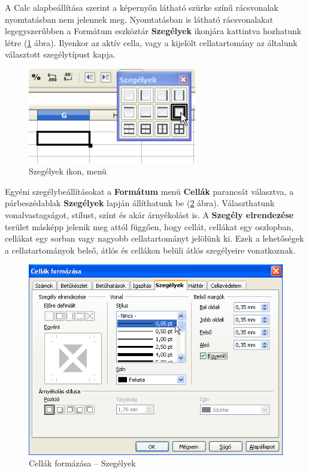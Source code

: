 A Calc alapbeállítása szerint a képernyőn látható
szürke színű rácsvonalak nyomtatásban nem jelennek meg.
Nyomtatásban is látható rácsvonalakat legegyszerűbben a
Formátum eszköztár \textbf{Szegélyek} ikonjára kattintva
hozhatunk létre (\ref{SzegélyekIkon} ábra).  Ilyenkor az aktív
cella, vagy a kijelölt cellatartomány az általunk választott
szegélytípust kapja.

\begin{figure}[!h]
\begin{center}
\includegraphics[width=7.351cm]{oocalcv1-img15.png}
\caption{Szegélyek ikon, menü}\label{SzegélyekIkon}
\end{center}
\end{figure}

Egyéni szegélybeállításokat a \textbf{Formátum} menü
\textbf{Cellák} parancsát választva, a párbeszédablak
\textbf{Szegélyek} lapján állíthatunk be (\ref{CellaSzegélyek} ábra).
Választhatunk vonalvastagságot, stílust, színt és akár
árnyékolást is. A \textbf{Szegély elrendezése} terület
másképp jelenik meg attól függően, hogy cellát,
cellákat egy oszlopban, cellákat egy sorban vagy nagyobb
cellatartományt jelölünk ki. Ezek a lehetőségek a
cellatartományok belső, átlós és cellákon belüli
átlós szegélyeire vonatkoznak.

\begin{figure}[!h]
\begin{center}
\includegraphics[width=13.891cm]{oocalcv1-img16.png}
\caption{Cellák formázása --  Szegélyek}\label{CellaSzegélyek}
\end{center}
\end{figure}

